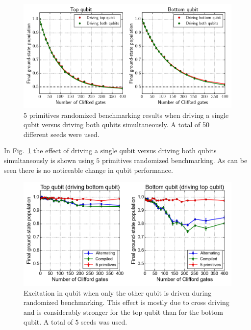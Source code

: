           \begin{figure}[tb]
            \centering
            \includegraphics[width=\textwidth]{Figures/Randomized benchmarking/RB_5p_driving_single_both.png}
            \caption{$5$ primitives randomized benchmarking results when driving a single qubit versus driving both qubits simultaneously. A total of 50 different seeds were used.}
            \label{fig:RB 5P single vs both}
          \end{figure}

          In Fig.~\ref{fig:RB 5P single vs both} the effect of driving a single qubit versus driving both qubits simultaneously is shown using $5$ primitives randomized benchmarking. As can be seen there is no noticeable change in qubit performance.

          \begin{figure}[tb]
            \centering
            \includegraphics[width=\textwidth]{Figures/Randomized benchmarking/RB_2Q_driving_single_vs_both.png}
            \caption{Excitation in qubit when only the other qubit is driven during randomized benchmarking. This effect is mostly due to cross driving and is considerably stronger for the top qubit than for the bottom qubit. A total of $5$ seeds was used.}
            \label{fig:cross driving two qubit randomized benchmarking}
          \end{figure}

